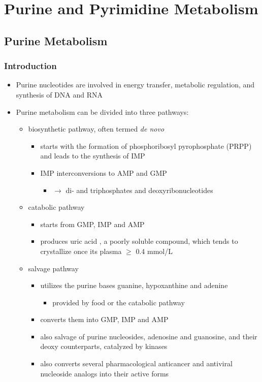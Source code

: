 \documentclass{scrartcl}
\begin{document}
\section{Purine and Pyrimidine Metabolism}
\label{sec:org1da3842}
\subsection{Purine Metabolism}
\label{sec:org0201355}
\subsubsection{Introduction}
\label{sec:org9bf616e}
\begin{itemize}
\item Purine nucleotides are involved in energy transfer, metabolic
regulation, and synthesis of DNA and RNA
\item Purine metabolism can be divided into three pathways:
\begin{itemize}
\item biosynthetic pathway, often termed \emph{de novo}
\begin{itemize}
\item starts with the formation of phosphoribosyl pyrophosphate (PRPP)
and leads to the synthesis of IMP
\item IMP interconversions to AMP and GMP
\begin{itemize}
\item \(\to\) di- and triphosphates and deoxyribonucleotides
\end{itemize}
\end{itemize}
\item catabolic pathway
\begin{itemize}
\item starts from GMP, IMP and AMP
\item produces uric acid , a poorly soluble compound, which tends to
crystallize once its plasma \(\ge\) 0.4 mmol/L
\end{itemize}
\item salvage pathway
\begin{itemize}
\item utilizes the purine bases guanine, hypoxanthine and adenine
\begin{itemize}
\item provided by food or the catabolic pathway
\end{itemize}
\item converts them into GMP, IMP and AMP
\item also salvage of purine nucleosides, adenosine and guanosine, and
their deoxy counterparts, catalyzed by kinases
\item also converts several pharmacological anticancer and antiviral
nucleoside analogs into their active forms
\end{itemize}
\end{itemize}


\end{itemize}
\end{document}
